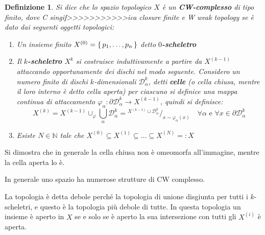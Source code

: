 \documentclass[10pt, twoside=false, x11names]{scrbook}
\newtheorem{definition}[theorem]{Definizione}
\newcommand{\Sph}[1][]{\mathcal{S}^#1}
\newcommand{\Disk}[1][]{\mathcal{D}^#1}
\newcommand*\quot[2]{{^{\textstyle #1}\big/_{\textstyle #2}}}
\let\phi\varphi
\begin{document}

\begin{definition}
  Si dice che lo spazio topologico $ X $ è un \textbf{CW-complesso} di tipo finito,
  dove C singif>>>>>>>>>>>ica \emph{closure finite} e W \emph{weak topology} se è dato dai seguenti oggetti topologici:
  \begin{enumerate}
  \item Un insieme finito $ X^{(0)} = \set{p_1, \dots, p_n} $ detto \textbf{$ 0 $-scheletro}
  \item Il \textbf{$ k $-scheletro} $ X^{k} $ si costruisce induttivamente
    a partire da $ X^{(k-1)} $ attaccando opportunamente dei dischi nel modo seguente.
    Considero un numero finito di dischi $ k $-dimensionali $ \Disk{k}_\alpha $,
    detti \textbf{celle} (o cella chiusa, mentre
    il loro interno è detto cella aperta) per ciascuno si definice una mappa
    continua di attaccamento $ \phi_\alpha \colon \partial\Disk{k}_\alpha \to X^{(k-1)} $, quindi si definisce:
    \[
      X^{(k)} = X^{(k-1)} \cup_\phi \bigcup_\alpha \Disk{k}_\alpha = \quot{ X^{(k-1)} \sqcup \Disk{k}_\alpha}{x \sim \phi_\alpha(x)} \quad \forall \alpha \text{ e }
      \forall x \in \partial \Disk{k}_\alpha
    \]
  \item Esiste $ N \in \mathbb{N} $ tale che $ X^{(0)} \subseteq X^{(1)} \subseteq \dots \subseteq X^{(N)} =: X $
  \end{enumerate}
\end{definition}

Si dimostra che in generale la cella chiusa non è omeomorfa all'immagine, mentre la cella
aperta lo è.

In generale uno spazio ha numerose strutture di CW complesso.

La topologia è detta debole perché la topologia di unione disgiunta per tutti i $ k $-scheletri,
e questo è la topologia più debole di tutte. In questa topologia un insieme è aperto in $ X $
se e solo se è aperto la sua intersezione con tutti gli $ X^{(i)} $ è aperta.
\end{document}
